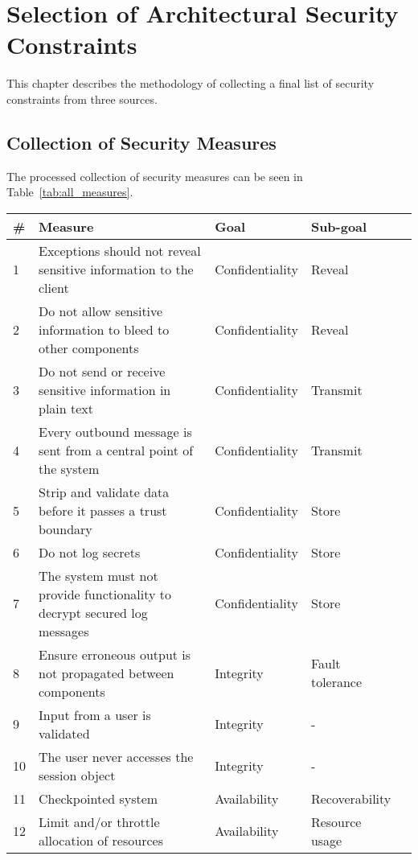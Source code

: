 \chapter{Selection of Architectural Security Constraints}

This chapter describes the methodology of collecting a final list of security constraints from three sources. 

\section{Collection of Security Measures}

The processed collection of security measures can be seen in Table~\ref{tab:all_measures}.

\begin{table}
\begin{tabular}{lp{7cm}lll}
\hline
\textbf{\#} & \textbf{Measure} & \textbf{Goal} & \textbf{Sub-goal} \\
\hline
1  & Exceptions should not reveal sensitive information to the client & Confidentiality & Reveal \\
\rowcolor{RowColor}
2  & Do not allow sensitive information to bleed to other components & Confidentiality & Reveal \\
3  & Do not send or receive sensitive information in plain text & Confidentiality & Transmit \\
\rowcolor{RowColor}
4  & Every outbound message is sent from a central point of the system & Confidentiality & Transmit \\
5  & Strip and validate data before it passes a trust boundary & Confidentiality & Store \\
\rowcolor{RowColor}
6  & Do not log secrets & Confidentiality & Store \\
7  & The system must not provide functionality to decrypt secured log messages & Confidentiality & Store \\
\rowcolor{RowColor}
8  & Ensure erroneous output is not propagated between components & Integrity & Fault tolerance \\
9  & Input from a user is validated & Integrity & - \\
\rowcolor{RowColor}
10 & The user never accesses the session object & Integrity & - \\
11 & Checkpointed system & Availability & Recoverability \\
\rowcolor{RowColor}
12 & Limit and/or throttle allocation of resources & Availability & Resource usage \\

\end{tabular}
\end{table}
